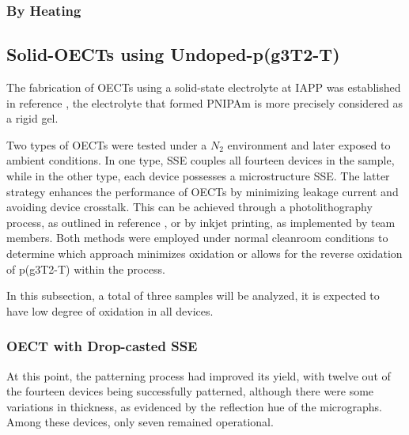 \subsubsection{By Heating}


\subsection{Solid-OECTs using Undoped-p(g3T2-T)}
The fabrication of OECTs using a solid-state electrolyte at IAPP%
was established in reference  \cite{weissbachPhotopatternableSolidElectrolyte2022}, the electrolyte that formed PNIPAm is more precisely considered as a rigid gel.

Two types of OECTs were tested under a $N_{2}$ environment and later exposed to ambient conditions. In one type, SSE couples all fourteen devices in the sample, while in the other type, each device possesses a microstructure SSE. The latter strategy enhances the performance of OECTs by minimizing leakage current and avoiding device crosstalk. This can be achieved through a photolithography process, as outlined in reference \cite{weissbachPhotopatternableSolidElectrolyte2022}, or by inkjet printing, as implemented by team members. Both methods were employed under normal cleanroom conditions to determine which  approach minimizes oxidation or allows for the reverse oxidation of p(g3T2-T) within the process. 

In this subsection, a total of three samples will be analyzed, it is expected to have low degree of oxidation in all devices.


\subsubsection{OECT with Drop-casted SSE}%
At this point, the patterning process had improved its yield, with twelve out of the fourteen devices being successfully patterned, although there were some variations in thickness, as evidenced by the reflection hue of the micrographs. Among these devices, only seven remained operational.

